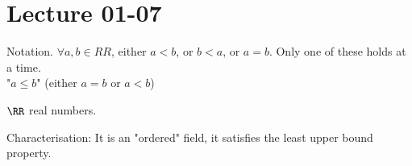 \documentclass[class=scrartcl, crop=false]{standalone}
\date{2020-01-07}
\begin{document}
\section{Lecture 01-07}

\begin{definition}[Ordered]
  Notation. $\forall a, b \in RR$, either $a < b$, or $b < a$, or $a = b$. Only one of these holds at a time.
  \\
  "$a \leq b$" (either $a = b$ or $a < b$)
\end{definition} 

$\RR$ real numbers.

Characterisation: It is an "ordered" field, it satisfies the least upper bound property.
\end{document}
